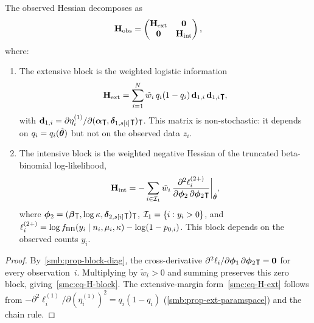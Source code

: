 \begin{proposition}
\label{smc:prop-H-blockdiag}
  The observed Hessian decomposes as
  \begin{equation}\label{smc:eq-H-block}
    \mathbf{H}_{\mathrm{obs}}
    = \begin{pmatrix}
        \mathbf{H}_{\textup{ext}} & \mathbf{0} \\
        \mathbf{0} & \mathbf{H}_{\textup{int}}
      \end{pmatrix},
  \end{equation}
  where\textup{:}
  \begin{enumerate}[label=\textup{(\roman*)},nosep]
    \item The extensive block is the weighted logistic information
    \begin{equation}\label{smc:eq-H-ext}
      \mathbf{H}_{\textup{ext}}
      = \sum_{i=1}^{N}\tilde{w}_i\,q_i(1-q_i)\,
        \mathbf{d}_{1,i}\,\mathbf{d}_{1,i}\intercal,
    \end{equation}
    with $\mathbf{d}_{1,i}
    = \partial\eta_i^{(1)}/\partial(\boldsymbol{\alpha}\intercal,\boldsymbol{\delta}_{1,s[i]}\intercal)\intercal$.
    This matrix is non-stochastic: it depends on $q_i = q_i(\hat{\boldsymbol{\theta}})$
    but not on the observed data $z_i$.

    \item The intensive block is the weighted negative Hessian of the
    truncated beta-binomial log-likelihood,
    \begin{equation}\label{smc:eq-H-int}
      \mathbf{H}_{\textup{int}}
      = -\sum_{i \in \mathcal{I}_1}\tilde{w}_i\,
        \frac{\partial^2 \ell_i^{(2+)}}
             {\partial\boldsymbol{\phi}_2\,\partial\boldsymbol{\phi}_2\intercal}
        \bigg|_{\hat{\boldsymbol{\theta}}},
    \end{equation}
    where $\boldsymbol{\phi}_2
    = (\boldsymbol{\beta}\intercal,\log\kappa,\boldsymbol{\delta}_{2,s[i]}\intercal)\intercal$,
    $\mathcal{I}_1 = \{i : y_i > 0\}$, and
    $\ell_i^{(2+)} = \log f_{\textup{BB}}(y_i \mid n_i,\mu_i,\kappa)
     - \log(1-p_{0,i})$.
    This block depends on the observed counts $y_i$.
  \end{enumerate}
\end{proposition}

\begin{proof}
  By~\cref{smb:prop-block-diag}, the cross-derivative
  $\partial^2\ell_i/\partial\boldsymbol{\phi}_1\,\partial\boldsymbol{\phi}_2\intercal
  = \mathbf{0}$
  for every observation~$i$.  Multiplying by $\tilde{w}_i > 0$ and
  summing preserves this zero block, giving~\eqref{smc:eq-H-block}.
  The extensive-margin form~\eqref{smc:eq-H-ext} follows from
  $-\partial^2\ell_i^{(1)}/\partial(\eta_i^{(1)})^2 = q_i(1-q_i)$
  (\cref{smb:prop-ext-paramspace}) and the chain rule.
\end{proof}

